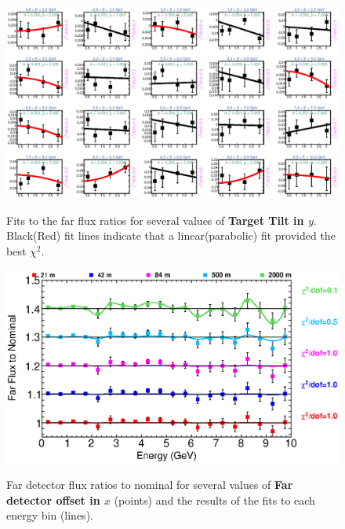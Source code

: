 {\begin{figure}[ht]
  \begin{center}
    {\includegraphics[width=5.0in]{figures/TargetYTilt_far_fits.eps}}
  \end{center}
\caption{ Fits to the far flux ratios for several values of {\bf Target Tilt in $y$}. Black(Red) fit lines indicate that a linear(parabolic) fit provided the best $\chi^2$. }
\end{figure}


\begin{figure}[ht]
  \begin{center}
    {\includegraphics[width=6.0in]{figures/LBNEFDX_far_summary.eps}}
  \end{center}
\caption{ Far detector flux ratios to nominal for several values of {\bf Far detector offset in $x$} (points) and the results of the fits to each energy bin (lines).}
\end{figure}

}
